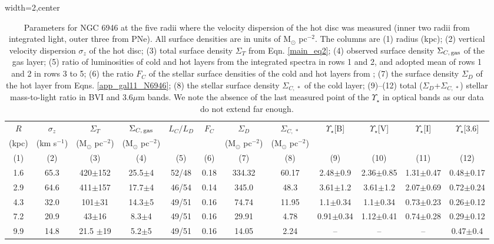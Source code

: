 \documentclass[fleqn,usenatbib]{mnras}
\newcommand{\kms}{km s$^{-1}$}
\newcommand{\mspc}{M$_\odot$ pc$^{-2}$}
\begin{document}
 \begin{table} %
 \begin{adjustbox}{width=2\columnwidth,center}
\begin{tabular}{cccccccccccc}
\hline
$R$ & $\sigma_z$ & $\Sigma_T$ & $\Sigma_{C,\,\rm gas}$ & $L_C/L_D$ & $F_C$ & $\Sigma_D$ & $\Sigma_{C,\,*}$ & $\Upsilon_{\star}$[B] & $\Upsilon_{\star}$[V] & $\Upsilon_{\star}$[I] & $\Upsilon_{\star}$[3.6]  \\ 
(kpc) & (\kms) & (M$_\odot$ pc$^{-2}$)  & (M$_\odot$ pc$^{-2}$)   &     &   & (M$_\odot$ pc$^{-2}$)  &(M$_\odot$ pc$^{-2}$)  & & & & \\ 
(1) & (2) & (3) & (4) & (5) & (6) & (7) & (8) & (9)& (10) & (11) & (12)  \\
\hline 

1.6  & 65.3 & 420$\pm$152   &   25.5$\pm$4   & 52/48 & 0.18 & 334.32  & 60.17 & 2.48$\pm$0.9 &  2.36$\pm$0.85  &  1.31$\pm$0.47   &    0.48$\pm$0.17\\  
2.9  & 64.6 & 411$\pm$157   &   17.7$\pm$4   & 46/54 & 0.14 & 345.0      & 48.3  & 3.61$\pm$1.2 &   3.61$\pm$1.2  &   2.07$\pm$0.69    &   0.72$\pm$0.24\\  
4.3  & 32.0 & 101$\pm$31      &  14.3$\pm$5  & 49/51 & 0.16 & 74.74    & 11.95 & 1.1$\pm$0.34  &  1.1$\pm$0.34     &    0.73$\pm$0.23   &   0.26$\pm$0.12\\  %
7.2  & 20.9 &  43$\pm$16       &  8.3$\pm$4    & 49/51 & 0.16 & 29.91    &  4.78  & 0.91$\pm$0.34  &   1.12$\pm$0.41&    0.74$\pm$0.28   &   0.29$\pm$0.12\\  %
9.9 & 14.8 &  21.5 $\pm$19    &  5.2$\pm$5    & 49/51 & 0.16 & 14.05      & 2.24 &   --      &    --     &   --      &   0.47$\pm$0.4\\  %
\hline
\end{tabular}
\end{adjustbox}
\caption[Parameters for NGC 6946 at the five radii where the velocity dispersion of the hot disc was measured.]{ Parameters for NGC 6946 at the five radii where the velocity dispersion of the hot disc was measured  (inner two radii from integrated light, outer three from PNe). All surface densities are in units of \mspc. The columns are (1) radius (kpc); (2) vertical velocity dispersion $\sigma_z$ of the hot disc; (3) total surface density $\Sigma_T$ from Eqn. \ref{main_eq2}; (4) observed surface density $\Sigma_{C,\,\rm gas}$ of the gas layer; (5) ratio of luminosities of cold and hot layers from the integrated spectra in rows 1 and 2, and adopted mean of rows 1 and 2 in rows 3 to 5; (6) the ratio $F_C$ of the stellar surface densities of the cold and hot layers from \citet{Bruzual:03}; (7) the surface density $\Sigma_D$ of the hot layer from Eqns. \ref{app_gal11_N6946}; (8) the stellar surface density $\Sigma_{C,\,*}$ of the cold layer; (9)--(12) total ($\Sigma_D$+$\Sigma_{C,\,*}$) stellar mass-to-light ratio in BVI and 3.6$\mu$m bands. We note the absence of the last measured point of the $\Upsilon_{\star}$ in optical bands as our data do not extend far enough.}
\label{app_tab1_N6946}
\end{table}
\end{document}
